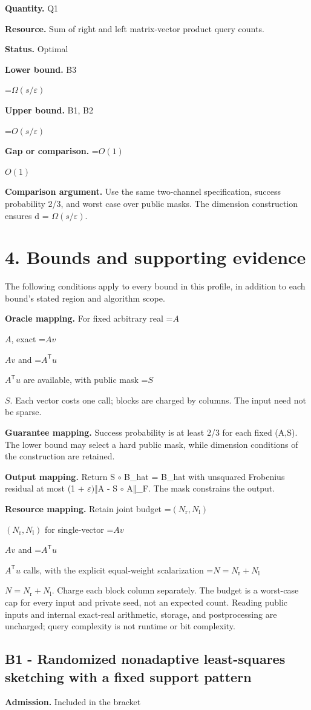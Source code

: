 \documentclass[10pt,a4paper]{article}
\newcommand{\AtlasMath}[1]{\par\begingroup\centering\setbox0=\hbox{$\displaystyle #1$}\ifdim\wd0>1.4\linewidth\typeout{ATLAS WIDE FORMULA: \the\wd0}\fi\ifdim\wd0>\linewidth\resizebox{\linewidth}{!}{\box0}\else\box0\fi\par\endgroup}
\newcommand{\AtlasInlineMath}[1]{\begingroup\setbox0=\hbox{$#1$}\ifdim\wd0>.4\linewidth\endgroup\AtlasMath{#1}\else\endgroup$#1$\fi}
\begin{document}
\textbf{Quantity.} Q1

\textbf{Resource.} Sum of right and left matrix-vector product query counts.

\textbf{Status.} Optimal

\textbf{Lower bound.} B3

\AtlasMath{\Omega(s/\varepsilon)}
\textbf{Upper bound.} B1, B2

\AtlasMath{O(s/\varepsilon)}
\textbf{Gap or comparison.} \AtlasInlineMath{O(1)}

\textbf{Comparison argument.} Use the same two-channel specification, success probability 2/3, and worst case over public masks. The dimension construction ensures d = $\Omega (s/\varepsilon )$.

\section{4. Bounds and supporting evidence}
The following conditions apply to every bound in this profile, in addition to each bound's stated region and algorithm scope.

\textbf{Oracle mapping.} For fixed arbitrary real \AtlasInlineMath{A}, exact \AtlasInlineMath{Av} and \AtlasInlineMath{A^{\mathsf T}u} are available, with public mask \AtlasInlineMath{S}. Each vector costs one call; blocks are charged by columns. The input need not be sparse.

\textbf{Guarantee mapping.} Success probability is at least 2/3 for each fixed (A,S). The lower bound may select a hard public mask, while dimension conditions of the construction are retained.

\textbf{Output mapping.} Return S $\circ$ B\_hat = B\_hat with unsquared Frobenius residual at most (1 + $\varepsilon )$‖A - S $\circ$ A‖\_F. The mask constrains the output.

\textbf{Resource mapping.} Retain joint budget \AtlasInlineMath{(N_{\mathrm r},N_{\mathrm l})} for single-vector \AtlasInlineMath{Av} and \AtlasInlineMath{A^{\mathsf T}u} calls, with the explicit equal-weight scalarization \AtlasInlineMath{N=N_{\mathrm r}+N_{\mathrm l}}. Charge each block column separately. The budget is a worst-case cap for every input and private seed, not an expected count. Reading public inputs and internal exact-real arithmetic, storage, and postprocessing are uncharged; query complexity is not runtime or bit complexity.

\subsection{B1 - Randomized nonadaptive least-squares sketching with a fixed support pattern}
\textbf{Admission.} Included in the bracket
\end{document}
